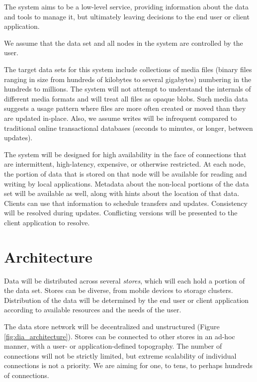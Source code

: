 \documentclass[12pt,a4paper,two-side]{book}
\newcommand{\newterm}{\textit}
\begin{document}
The system aims to be a low-level service, providing information about the data
and tools to manage it, but ultimately leaving decisions to the end user or
client application.

We assume that the data set and all nodes in the system are controlled by the
user.

The target data sets for this system include collections of media files (binary
files ranging in size from hundreds of kilobytes to several gigabytes) numbering
in the hundreds to millions. The system will not attempt to understand the
internals of different media formats and will treat all files as opaque blobs.
Such media data suggests a usage pattern where files are more often created or
moved than they are updated in-place. Also, we assume writes will be infrequent
compared to traditional online transactional databases (seconds to minutes, or
longer, between updates).

The system will be designed for high availability in the face of connections
that are intermittent, high-latency, expensive, or otherwise restricted. At each
node, the portion of data that is stored on that node will be available for
reading and writing by local applications. Metadata about the non-local portions
of the data set will be available as well, along with hints about the location
of that data. Clients can use that information to schedule transfers and
updates. Consistency will be resolved during updates. Conflicting versions will
be presented to the client application to resolve.









\chapter{Architecture}\label{architecture}

Data will be distributed across several \newterm{stores}, which will each hold a
portion of the data set. Stores can be diverse, from mobile devices to storage
clusters. Distribution of the data will be determined by the end user or client
application according to available resources and the needs of the user.

The data store network will be decentralized and unstructured (Figure
\ref{fig:dia_architecture}). Stores can be connected to other stores in an ad-hoc
manner, with a user- or application-defined topography. The number of
connections will not be strictly limited, but extreme scalability of individual
connections is not a priority. We are aiming for one, to tens, to perhaps
hundreds of connections.
\end{document}
